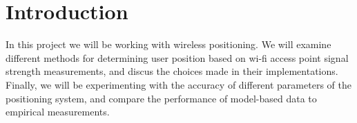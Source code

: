 \section{Introduction}

In this project we will be working with wireless positioning.
We will examine different methods for determining user position based on wi-fi access point signal strength measurements, and discus the choices made in their implementations.
Finally, we will be experimenting with the accuracy of different parameters of the positioning system, and compare the performance of model-based data to empirical measurements. 